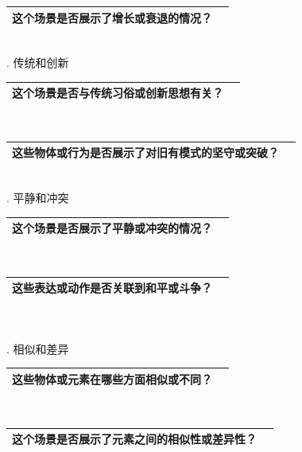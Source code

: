 \documentclass[12pt]{book}
\begin{document}
\begin{tabular}{|p{15cm}|p{3cm}|}
	\hline
这个场景是否展示了增长或衰退的情况？\\
	\hline
\end{tabular}\\



. 传统和创新

\begin{tabular}{|p{15cm}|p{3cm}|}
	\hline
这个场景是否与传统习俗或创新思想有关？\\
	\hline
\end{tabular}\\


\begin{tabular}{|p{15cm}|p{3cm}|}
	\hline
这些物体或行为是否展示了对旧有模式的坚守或突破？\\
	\hline
\end{tabular}\\



. 平静和冲突

\begin{tabular}{|p{15cm}|p{3cm}|}
	\hline
这个场景是否展示了平静或冲突的情况？\\
	\hline
\end{tabular}\\



\begin{tabular}{|p{15cm}|p{3cm}|}
	\hline
这些表达或动作是否关联到和平或斗争？\\
	\hline
\end{tabular}\\\\



. 相似和差异

\begin{tabular}{|p{15cm}|p{3cm}|}
	\hline
这些物体或元素在哪些方面相似或不同？\\
	\hline
\end{tabular}\\



\begin{tabular}{|p{15cm}|p{3cm}|}
	\hline
这个场景是否展示了元素之间的相似性或差异性？\\
	\hline
\end{tabular}\\
\end{document}
